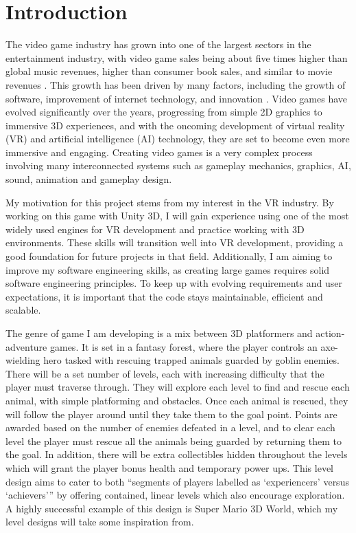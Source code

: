 \documentclass[]{final_report}
\begin{document}
\chapter{Introduction}
The video game industry has grown into one of the largest sectors in the entertainment industry, with video game sales being about five times higher than global music revenues, higher than consumer book sales, and similar to movie revenues \cite{marchand2013value}. This growth has been driven by many factors, including the growth of software, improvement of internet technology, and innovation \cite{zackariasson2012video} . Video games have evolved significantly over the years, progressing from simple 2D graphics to immersive 3D experiences, and with the oncoming development of virtual reality (VR) and artificial intelligence (AI) technology, they are set to become even more immersive and engaging. Creating video games is a very complex process involving many interconnected systems such as gameplay mechanics, graphics, AI, sound, animation and gameplay design. \newline

My motivation for this project stems from my interest in the VR industry. By working on this game with Unity 3D, I will gain experience using one of the most widely used engines for VR development and practice working with 3D environments. These skills will transition well into VR development, providing a good foundation for future projects in that field. Additionally, I am aiming to improve my software engineering skills, as creating large games requires solid software engineering principles. To keep up with evolving requirements and user expectations, it is important that the code stays maintainable, efficient and scalable.\newline

The genre of game I am developing is a mix between 3D platformers and action-adventure games. It is set in a fantasy forest, where the player controls an axe-wielding hero tasked with rescuing trapped animals guarded by goblin enemies. There will be a set number of levels, each with increasing difficulty that the player must traverse through. They will explore each level to find and rescue each animal, with simple platforming and obstacles. Once each animal is rescued, they will follow the player around until they take them to the goal point. Points are awarded based on the number of enemies defeated in a level, and to clear each level the player must rescue all the animals being guarded by returning them to the goal. In addition, there will be extra collectibles hidden throughout the levels which will grant the player bonus health and temporary power ups. This level design aims to cater to both ``segments of players labelled as `experiencers' versus `achievers''' \cite{zhao2022dynamic} by offering contained, linear levels which also encourage exploration. A highly successful example of this design is Super Mario 3D World, which my level designs will take some inspiration from.\newline
\end{document}
